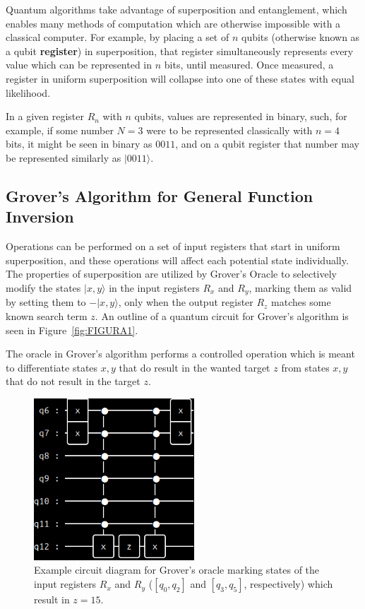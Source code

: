 \documentclass[twocolumn]{cinc}
\begin{document}
Quantum algorithms take advantage of superposition and entanglement,
which enables many methods of computation which are otherwise impossible
with a classical computer. For example, by placing a set of $n$ qubits 
(otherwise known as a qubit \textbf{register}) in superposition, that register
simultaneously represents every value which can be represented in $n$ bits,
until measured. Once measured, a register in uniform superposition will 
collapse into one of these states with equal likelihood.

In a given register $R_n$ with $n$ qubits, values are represented in binary,
such, for example, if some number $N=3$ were to be represented classically
with $n=4$ bits, it might be seen in binary as $0011$, and on a qubit
register that number may be represented similarly as $| 0011 \rangle$.

  \subsection{Grover's Algorithm for General Function Inversion} 

  Operations can be performed on a set of input registers that start in uniform 
  superposition, and these operations will affect each potential state individually. 
  The properties of superposition are utilized by Grover's Oracle to selectively 
  modify the states $|x,y\rangle$ in the input registers $R_x$ and $R_y$,
  marking them as valid by setting them to $-|x,y\rangle$, only when the output register
  $R_z$ matches some known search term $z$. An outline of a quantum circuit for
  Grover's algorithm is seen in Figure~\ref{fig:FIGURA1}.

  The oracle in Grover's algorithm performs a controlled operation which is meant
  to differentiate states $x,y$ that do result in the wanted target $z$ from 
  states $x,y$ that do not result in the target $z$.
  
  \begin{figure}[h]\label{fig:FIGURA2}
  \centering
  \includegraphics[width=6.0cm]{oracle_15.png}
  \caption{Example circuit diagram for Grover's oracle marking states of the input
  registers $R_x$ and $R_y$ ($[q_0,q_2]$ and $[q_3,q_5]$, respectively) which
  result in $z=15$.}
  \end{figure}
\end{document}
